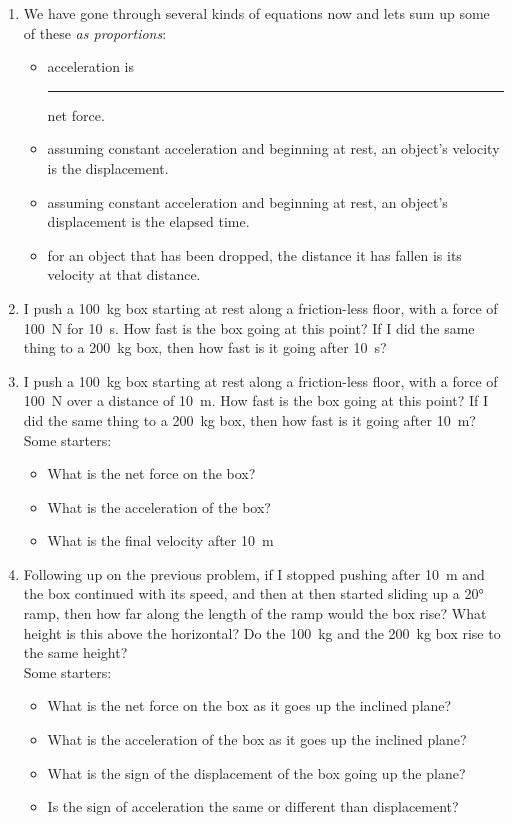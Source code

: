 \begin{enumerate}
\setlength\itemsep{1 in}

\item 
We have gone through several kinds of equations now and lets sum up some of these \emph{as proportions}:
\begin{itemize}
	\setlength\itemsep{.5 in}
	\item acceleration is \rule{1in}{0.1mm} net force.
	\item assuming constant acceleration and beginning at rest, an object's velocity is \blank the displacement.
	\item assuming constant acceleration and beginning at rest, an object's displacement is \blank the elapsed time.
	\item for an object that has been dropped, the distance it has fallen is \blank its velocity at that distance.
\end{itemize} 
\medskip


\item
I push a \SI{100}{kg} box starting at rest along a friction-less floor, with a force of \SI{100}{\newton} for \SI{10}{\second}. How fast is the box going at this point? If I did the same thing to a \SI{200}{kg} box, then how fast is it going after \SI{10}{s}?
\hugeskip

\item
I push a \SI{100}{kg} box starting at rest along a friction-less floor, with a force of \SI{100}{\newton} over a distance of \SI{10}{m}. How fast is the box going at this point? If I did the same thing to a \SI{200}{kg} box, then how fast is it going after \SI{10}{m}?\\
Some starters:
\begin{itemize}
	\item What is the net force on the box?
	\item What is the acceleration of the box?
	\item What is the final velocity after \SI{10}{\meter}
\end{itemize}
\hugeskip


\item
Following up on the previous problem, if I stopped pushing after \SI{10}{m} and the box continued with its speed, and then at then started sliding up a \ang{20} ramp, then how far along the length of the ramp would the box rise? What height is this above the horizontal?  Do the \SI{100}{kg} and the \SI{200}{kg} box rise to the same height?\\
Some starters:
\begin{itemize}
	\item What is the net force on the box as it goes up the inclined plane?
	\item What is the acceleration of the box as it goes up the inclined plane?
	\item What is the sign of the displacement of the box going up the plane?
	\item Is the sign of acceleration the same or different than displacement? 
\end{itemize}
\hugeskip


\end{enumerate}
